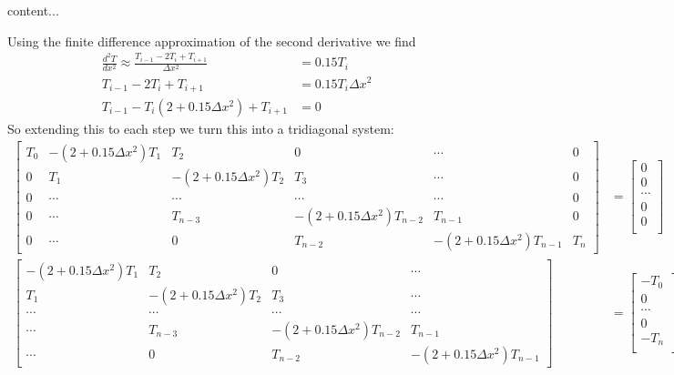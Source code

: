 \documentclass{article}
\begin{document}
\begin{solution}
content...
\end{solution}

\begin{solution}
Using the finite difference approximation of the second derivative we find
\begin{align*}
\frac{d^{2}T}{dx^{2}} \approx \frac{T_{i-1} -2T_{i} +T_{i+1}}{\Delta x^{2}} &= 0.15T_{i}\\
T_{i-1} -2T_{i} +T_{i+1} &= 0.15T_{i}\Delta x^{2}\\
T_{i-1} -T_{i}(2+0.15\Delta x^{2}) +T_{i+1} &= 0
\end{align*}
So extending this to each step we turn this into a tridiagonal system:
\begin{align*}
\begin{bmatrix}
T_{0}	&	-(2+0.15\Delta x^{2})T_{1}	&	T_{2}	&	0	&\cdots		&	0\\
0		&	T_{1}	&	-(2+0.15\Delta x^{2})T_{2}	&	T_{3}	&\cdots	&	0\\
0	&	\cdots	&	\cdots	&	\cdots	&	\cdots	&	0	\\
0	&	\cdots	&	T_{n-3}	&	-(2+0.15\Delta x^{2})T_{n-2}	&	T_{n-1}	&	0\\
0	&	\cdots	&	0	&	T_{n-2}	&	-(2+0.15\Delta x^{2})T_{n-1}	&	T_{n}
\end{bmatrix}
&=
\begin{bmatrix}
0\\
0\\
\cdots\\
0\\
0\\
\end{bmatrix}
\\
\begin{bmatrix}
-(2+0.15\Delta x^{2})T_{1}	&	T_{2}	&	0	&\cdots	\\
T_{1}	&	-(2+0.15\Delta x^{2})T_{2}	&	T_{3}	&\cdots	\\
\cdots	&	\cdots	&	\cdots	&	\cdots	\\
\cdots	&	T_{n-3}	&	-(2+0.15\Delta x^{2})T_{n-2}	&	T_{n-1}\\
\cdots	&	0	&	T_{n-2}	&	-(2+0.15\Delta x^{2})T_{n-1}
\end{bmatrix}
&=
\begin{bmatrix}
-T_{0}\\
0\\
\cdots\\
0\\
-T_{n}\\
\end{bmatrix}

\end{align*}
\end{solution}
\end{document}
